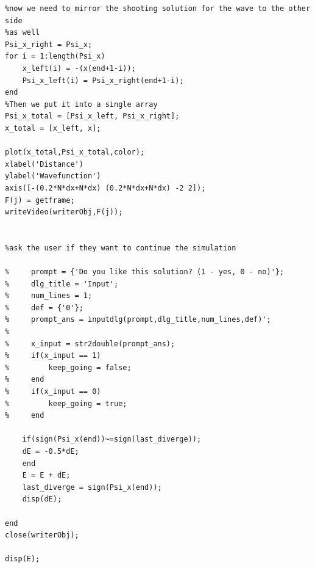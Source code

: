 \documentclass[12pt]{article}                  %
\begin{document}
\begin{verbatim}
%now we need to mirror the shooting solution for the wave to the other side
%as well
Psi_x_right = Psi_x;
for i = 1:length(Psi_x)
    x_left(i) = -(x(end+1-i));
    Psi_x_left(i) = Psi_x_right(end+1-i);
end
%Then we put it into a single array
Psi_x_total = [Psi_x_left, Psi_x_right];
x_total = [x_left, x];
   
plot(x_total,Psi_x_total,color);
xlabel('Distance')
ylabel('Wavefunction')
axis([-(0.2*N*dx+N*dx) (0.2*N*dx+N*dx) -2 2]);
F(j) = getframe;
writeVideo(writerObj,F(j));


%ask the user if they want to continue the simulation

%     prompt = {'Do you like this solution? (1 - yes, 0 - no)'};
%     dlg_title = 'Input';
%     num_lines = 1;
%     def = {'0'};
%     prompt_ans = inputdlg(prompt,dlg_title,num_lines,def)';
%     
%     x_input = str2double(prompt_ans);
%     if(x_input == 1)
%         keep_going = false;
%     end
%     if(x_input == 0)
%         keep_going = true;
%     end

    if(sign(Psi_x(end))~=sign(last_diverge));
    dE = -0.5*dE; 
    end
    E = E + dE;
    last_diverge = sign(Psi_x(end));
    disp(dE);
    
end
close(writerObj);

disp(E);

\end{verbatim}
\end{document}
